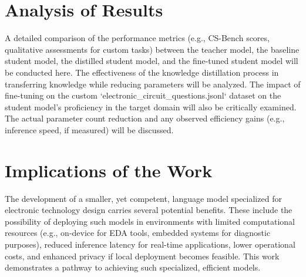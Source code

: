 \documentclass[12pt, a4paper]{report}
\begin{document}
\section{Analysis of Results}
\label{sec:analysis_of_results}
A detailed comparison of the performance metrics (e.g., CS-Bench scores, qualitative assessments for custom tasks) between the teacher model, the baseline student model, the distilled student model, and the fine-tuned student model will be conducted here. The effectiveness of the knowledge distillation process in transferring knowledge while reducing parameters will be analyzed. The impact of fine-tuning on the custom `electronic_circuit_questions.jsonl` dataset on the student model's proficiency in the target domain will also be critically examined. The actual parameter count reduction and any observed efficiency gains (e.g., inference speed, if measured) will be discussed.

\section{Implications of the Work}
\label{sec:implications_of_work}
The development of a smaller, yet competent, language model specialized for electronic technology design carries several potential benefits. These include the possibility of deploying such models in environments with limited computational resources (e.g., on-device for EDA tools, embedded systems for diagnostic purposes), reduced inference latency for real-time applications, lower operational costs, and enhanced privacy if local deployment becomes feasible. This work demonstrates a pathway to achieving such specialized, efficient models.
\end{document}
